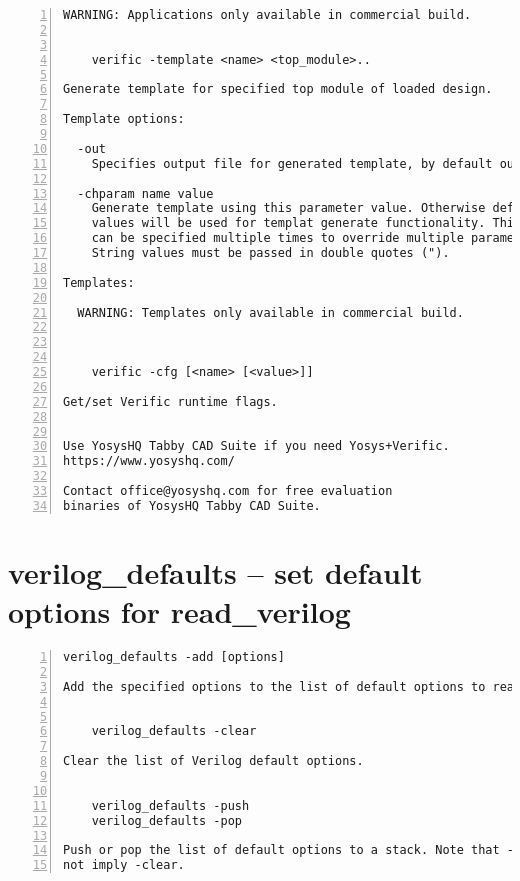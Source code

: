 \begin{lstlisting}[numbers=left,frame=single]
  WARNING: Applications only available in commercial build.


    verific -template <name> <top_module>..

Generate template for specified top module of loaded design.

Template options:

  -out
    Specifies output file for generated template, by default output is stdout

  -chparam name value 
    Generate template using this parameter value. Otherwise default parameter
    values will be used for templat generate functionality. This option
    can be specified multiple times to override multiple parameters.
    String values must be passed in double quotes (").

Templates:

  WARNING: Templates only available in commercial build.



    verific -cfg [<name> [<value>]]

Get/set Verific runtime flags.


Use YosysHQ Tabby CAD Suite if you need Yosys+Verific.
https://www.yosyshq.com/

Contact office@yosyshq.com for free evaluation
binaries of YosysHQ Tabby CAD Suite.
\end{lstlisting}

\section{verilog\_defaults -- set default options for read\_verilog}
\label{cmd:verilog_defaults}
\begin{lstlisting}[numbers=left,frame=single]
    verilog_defaults -add [options]

Add the specified options to the list of default options to read_verilog.


    verilog_defaults -clear

Clear the list of Verilog default options.


    verilog_defaults -push
    verilog_defaults -pop

Push or pop the list of default options to a stack. Note that -push does
not imply -clear.
\end{lstlisting}

